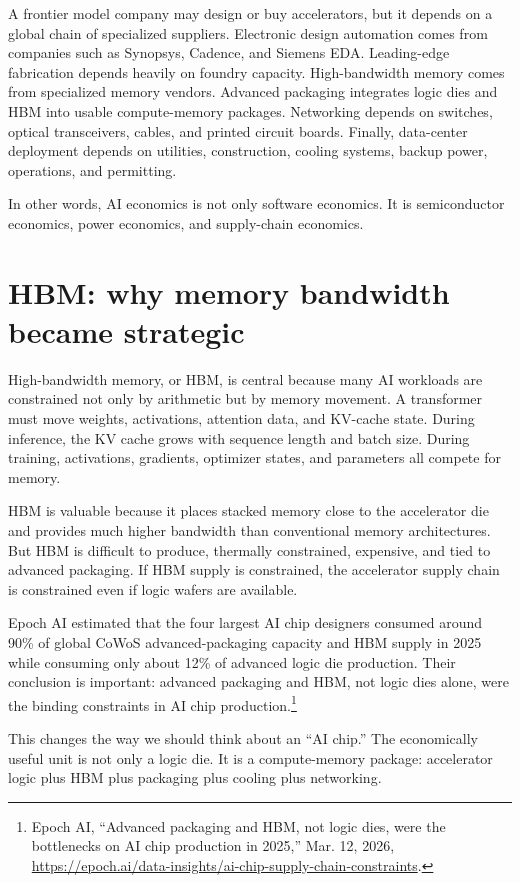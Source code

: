 A frontier model company may design or buy accelerators, but it depends on a global chain of specialized suppliers. Electronic design automation comes from companies such as Synopsys, Cadence, and Siemens EDA. Leading-edge fabrication depends heavily on foundry capacity. High-bandwidth memory comes from specialized memory vendors. Advanced packaging integrates logic dies and HBM into usable compute-memory packages. Networking depends on switches, optical transceivers, cables, and printed circuit boards. Finally, data-center deployment depends on utilities, construction, cooling systems, backup power, operations, and permitting.

In other words, AI economics is not only software economics. It is semiconductor economics, power economics, and supply-chain economics.

\section{HBM: why memory bandwidth became strategic}

High-bandwidth memory, or HBM, is central because many AI workloads are constrained not only by arithmetic but by memory movement. A transformer must move weights, activations, attention data, and KV-cache state. During inference, the KV cache grows with sequence length and batch size. During training, activations, gradients, optimizer states, and parameters all compete for memory.

HBM is valuable because it places stacked memory close to the accelerator die and provides much higher bandwidth than conventional memory architectures. But HBM is difficult to produce, thermally constrained, expensive, and tied to advanced packaging. If HBM supply is constrained, the accelerator supply chain is constrained even if logic wafers are available.

Epoch AI estimated that the four largest AI chip designers consumed around 90\% of global CoWoS advanced-packaging capacity and HBM supply in 2025 while consuming only about 12\% of advanced logic die production. Their conclusion is important: advanced packaging and HBM, not logic dies alone, were the binding constraints in AI chip production.\footnote{Epoch AI, ``Advanced packaging and HBM, not logic dies, were the bottlenecks on AI chip production in 2025,'' Mar. 12, 2026, \url{https://epoch.ai/data-insights/ai-chip-supply-chain-constraints}.}

This changes the way we should think about an ``AI chip.'' The economically useful unit is not only a logic die. It is a compute-memory package: accelerator logic plus HBM plus packaging plus cooling plus networking.

